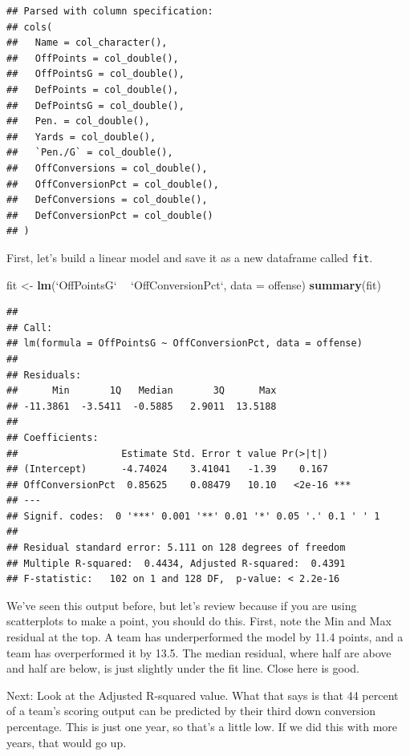 \documentclass[]{book}
\newenvironment{Shaded}{\begin{snugshade}}{\end{snugshade}}
\newcommand{\DataTypeTok}[1]{\textcolor[rgb]{0.13,0.29,0.53}{#1}}
\newcommand{\KeywordTok}[1]{\textcolor[rgb]{0.13,0.29,0.53}{\textbf{#1}}}
\newcommand{\NormalTok}[1]{#1}
\newcommand{\OperatorTok}[1]{\textcolor[rgb]{0.81,0.36,0.00}{\textbf{#1}}}
\newcommand{\StringTok}[1]{\textcolor[rgb]{0.31,0.60,0.02}{#1}}
\begin{document}
\begin{verbatim}
## Parsed with column specification:
## cols(
##   Name = col_character(),
##   OffPoints = col_double(),
##   OffPointsG = col_double(),
##   DefPoints = col_double(),
##   DefPointsG = col_double(),
##   Pen. = col_double(),
##   Yards = col_double(),
##   `Pen./G` = col_double(),
##   OffConversions = col_double(),
##   OffConversionPct = col_double(),
##   DefConversions = col_double(),
##   DefConversionPct = col_double()
## )
\end{verbatim}

First, let's build a linear model and save it as a new dataframe called \texttt{fit}.

\begin{Shaded}
\begin{Highlighting}[]
\NormalTok{fit <-}\StringTok{ }\KeywordTok{lm}\NormalTok{(}\StringTok{`}\DataTypeTok{OffPointsG}\StringTok{`} \OperatorTok{~}\StringTok{ `}\DataTypeTok{OffConversionPct}\StringTok{`}\NormalTok{, }\DataTypeTok{data =}\NormalTok{ offense)}
\KeywordTok{summary}\NormalTok{(fit)}
\end{Highlighting}
\end{Shaded}

\begin{verbatim}
## 
## Call:
## lm(formula = OffPointsG ~ OffConversionPct, data = offense)
## 
## Residuals:
##      Min       1Q   Median       3Q      Max 
## -11.3861  -3.5411  -0.5885   2.9011  13.5188 
## 
## Coefficients:
##                  Estimate Std. Error t value Pr(>|t|)    
## (Intercept)      -4.74024    3.41041   -1.39    0.167    
## OffConversionPct  0.85625    0.08479   10.10   <2e-16 ***
## ---
## Signif. codes:  0 '***' 0.001 '**' 0.01 '*' 0.05 '.' 0.1 ' ' 1
## 
## Residual standard error: 5.111 on 128 degrees of freedom
## Multiple R-squared:  0.4434, Adjusted R-squared:  0.4391 
## F-statistic:   102 on 1 and 128 DF,  p-value: < 2.2e-16
\end{verbatim}

We've seen this output before, but let's review because if you are using scatterplots to make a point, you should do this. First, note the Min and Max residual at the top. A team has underperformed the model by 11.4 points, and a team has overperformed it by 13.5. The median residual, where half are above and half are below, is just slightly under the fit line. Close here is good.

Next: Look at the Adjusted R-squared value. What that says is that 44 percent of a team's scoring output can be predicted by their third down conversion percentage. This is just one year, so that's a little low. If we did this with more years, that would go up.
\end{document}
